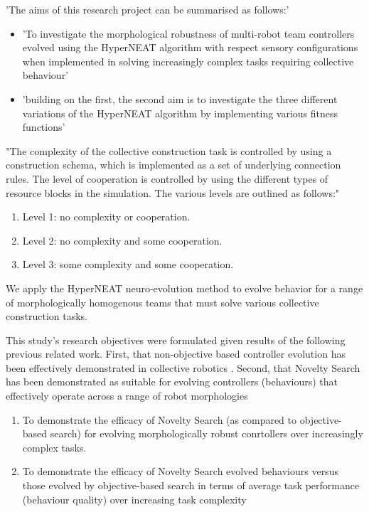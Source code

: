 'The aims of this research project can be summarised as follows:'
\begin{itemize}
	\item 'To investigate the morphological robustness of multi-robot team controllers evolved using the HyperNEAT algorithm with respect sensory configurations when implemented in solving increasingly complex tasks requiring collective behaviour'
	\item 'building on the first, the second aim is to investigate the three different variations of the HyperNEAT algorithm by implementing various fitness functions'
\end{itemize}

"The complexity of the collective construction task is controlled by using a construction schema, which is implemented as a set of underlying connection rules. The level of cooperation is controlled by using the different types of resource blocks in the simulation.
The various levels are outlined as follows:"
\begin{enumerate}
	\item Level 1: no complexity or cooperation.
	\item Level 2: no complexity and some cooperation.
	\item Level 3: some complexity and some cooperation.
\end{enumerate}

We apply the HyperNEAT \cite{StanleyDAmbrosioGauci2009} neuro-evolution method to evolve
behavior for a range of morphologically homogenous teams that must solve various collective construction tasks.

This study's research objectives were formulated given results of the following previous related work. First, that non-objective based controller evolution has been effectively demonstrated in collective robotics \cite{RefWorks:11, gomes2013generic, RefWorks:5}.
Second, that Novelty Search has been demonstrated as suitable for evolving controllers (behaviours) that effectively operate across a range of robot morphologies






\begin{enumerate}
	\item To demonstrate the efficacy of Novelty Search (as compared to objective-based search) for evolving morphologically robust conrtollers over increasingly complex tasks.
	\item To demonstrate the efficacy of Novelty Search evolved behaviours versus those evolved by objective-based search in terms of average task performance (behaviour quality) over increasing task complexity
\end{enumerate}

